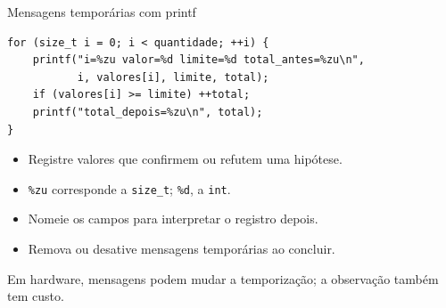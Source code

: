 \begin{frame}[fragile]{Mensagens temporárias com printf}
\begin{lstlisting}
for (size_t i = 0; i < quantidade; ++i) {
    printf("i=%zu valor=%d limite=%d total_antes=%zu\n",
           i, valores[i], limite, total);
    if (valores[i] >= limite) ++total;
    printf("total_depois=%zu\n", total);
}
\end{lstlisting}
\begin{itemize}
\item Registre valores que confirmem ou refutem uma hipótese.
\item \texttt{\%zu} corresponde a \texttt{size\_t}; \texttt{\%d}, a \texttt{int}.
\item Nomeie os campos para interpretar o registro depois.
\item Remova ou desative mensagens temporárias ao concluir.
\end{itemize}
\small Em hardware, mensagens podem mudar a temporização; a observação também tem custo.
\end{frame}
